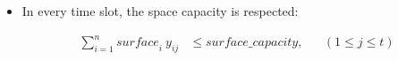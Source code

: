 \documentclass{article}
\begin{document}
\begin{itemize}
    \item In every time slot, the space capacity is respected:
    
    \begin{align}
        \sum^n_{i=1}\mathit{surface}_i \: y_{ij} &\leq \mathit{surface\_capacity}, &&(1 \leq j \leq t)
    \end{align}
    


\end{itemize}
\end{document}
